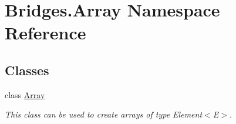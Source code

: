 \hypertarget{namespace_bridges_1_1_array}{}\section{Bridges.\+Array Namespace Reference}
\label{namespace_bridges_1_1_array}
\subsection*{Classes}
\begin{DoxyCompactItemize}
\item 
class \hyperlink{class_bridges_1_1_array_1_1_array}{Array}
\begin{DoxyCompactList}\small\item\em This class can be used to create arrays of type Element$<$\+E$>$. \end{DoxyCompactList}\end{DoxyCompactItemize}
